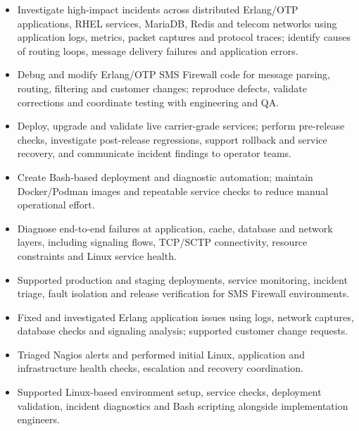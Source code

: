 \begin{itemize}
\item Investigate high-impact incidents across distributed Erlang/OTP applications,
RHEL services, MariaDB, Redis and telecom networks using application logs,
metrics, packet captures and protocol traces; identify causes of routing loops,
message delivery failures and application errors.
\item Debug and modify Erlang/OTP SMS Firewall code for message parsing, routing,
filtering and customer changes; reproduce defects, validate corrections and
coordinate testing with engineering and QA.
\item Deploy, upgrade and validate live carrier-grade services; perform pre-release
checks, investigate post-release regressions, support rollback and service
recovery, and communicate incident findings to operator teams.
\item Create Bash-based deployment and diagnostic automation; maintain Docker/Podman
images and repeatable service checks to reduce manual operational effort.
\item Diagnose end-to-end failures at application, cache, database and network layers,
including signaling flows, TCP/SCTP connectivity, resource constraints and
Linux service health.
\end{itemize}

\begin{itemize}
\item Supported production and staging deployments, service monitoring, incident
triage, fault isolation and release verification for SMS Firewall environments.
\item Fixed and investigated Erlang application issues using logs, network captures,
database checks and signaling analysis; supported customer change requests.
\item Triaged Nagios alerts and performed initial Linux, application and infrastructure
health checks, escalation and recovery coordination.
\end{itemize}

\begin{itemize}
\item Supported Linux-based environment setup, service checks, deployment validation,
incident diagnostics and Bash scripting alongside implementation engineers.
\end{itemize}

